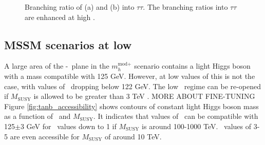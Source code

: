 \begin{figure}[h!]
\begin{center}
\end{center}
\caption{Branching ratio of (a) \PHiggs and (b) \PHiggsps into $\tau\tau$. The branching
ratios into $\tau\tau$ are enhanced at high \tanb.}
\label{fig:mhmodp_br}
\end{figure}


\subsection{MSSM scenarios at low \tanb}
\label{sec:mssm_theory_lowtb}
A large area of the \mA-\tanb~plane in the $m_{h}^{\text{mod+}}$ 
scenario contains a light Higgs boson with a mass compatible with
125 GeV. However, at low values of \tanb this is not the case, with
values of \mh~dropping below 122 GeV. The low \tanb~regime can be re-opened
if $M_{\text{SUSY}}$ is allowed to be greater than 3 TeV \cite{MSSM-reopen}. 
MORE ABOUT FINE-TUNING
Figure \ref{fig:tanb_accessibility} shows contours of constant
light Higgs boson mass as a function of \tanb~and $M_{\text{SUSY}}$.
It indicates that values of \mh~can be compatible with 125$\pm$3 GeV
for \tanb~values down to 1 if $M_{\text{SUSY}}$ is around 100-1000 TeV. 
\tanb~values of 3-5 are even accessible for $M_{\text{SUSY}}$ of around 10 TeV.

